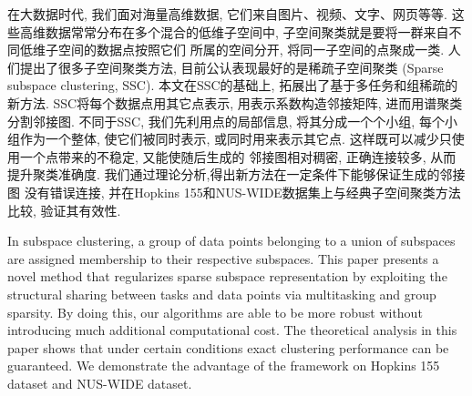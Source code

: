 \begin{cnabstract}
  在大数据时代, 我们面对海量高维数据, 它们来自图片、视频、文字、网页等等.
  这些高维数据常常分布在多个混合的低维子空间中,
  子空间聚类就是要将一群来自不同低维子空间的数据点按照它们
  所属的空间分开, 将同一子空间的点聚成一类.
  人们提出了很多子空间聚类方法, 目前公认表现最好的是稀疏子空间聚类
  (Sparse subspace clustering, SSC). 本文在SSC的基础上,
  拓展出了基于多任务和组稀疏的新方法.
  SSC将每个数据点用其它点表示, 用表示系数构造邻接矩阵,
  进而用谱聚类分割邻接图.
  不同于SSC, 我们先利用点的局部信息, 将其分成一个个小组,
  每个小组作为一个整体, 使它们被同时表示, 或同时用来表示其它点.
  这样既可以减少只使用一个点带来的不稳定, 又能使随后生成的
  邻接图相对稠密, 正确连接较多, 从而提升聚类准确度.
  我们通过理论分析,得出新方法在一定条件下能够保证生成的邻接图
  没有错误连接, 并在Hopkins 155和NUS-WIDE数据集上与经典子空间聚类方法比较,
  验证其有效性.
  
\end{cnabstract}

\begin{enabstract}
  In subspace clustering, a group of data points belonging
  to a union of subspaces are assigned membership to their
  respective subspaces. This paper presents a novel method
  that regularizes sparse subspace representation by exploiting the
  structural sharing between tasks and data points via multitasking
  and group sparsity. By doing this, our algorithms are able to be more robust
  without introducing much additional computational cost. The
  theoretical analysis in this paper shows that under certain conditions
  exact clustering performance can be guaranteed. We demonstrate
  the advantage of the framework on Hopkins 155 dataset and NUS-WIDE dataset.

\end{enabstract}
